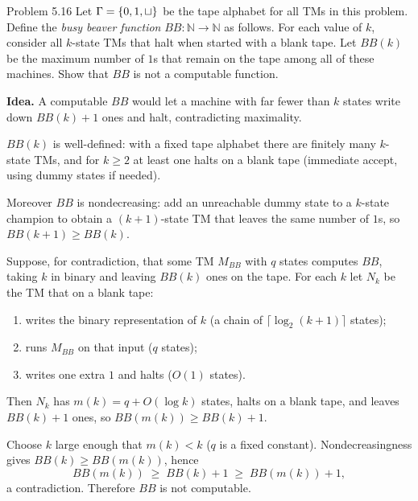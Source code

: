 \begin{question}{Problem 5.16}
Let $\Gamma=\{0,1,\sqcup\}$ be the tape alphabet for all TMs in this problem. Define the \emph{busy beaver function} $BB\colon\mathbb{N}\to\mathbb{N}$ as follows. For each value of $k$, consider all $k$-state TMs that halt when started with a blank tape. Let $BB(k)$ be the maximum number of $1$s that remain on the tape among all of these machines. Show that $BB$ is not a computable function.
\end{question}
\begin{soln}
\textbf{Idea.} A computable $BB$ would let a machine with far fewer than $k$ states write down $BB(k)+1$ ones and halt, contradicting maximality.

$BB(k)$ is well-defined: with a fixed tape alphabet there are finitely many $k$-state TMs, and for $k\ge 2$ at least one halts on a blank tape (immediate accept, using dummy states if needed).

Moreover $BB$ is nondecreasing: add an unreachable dummy state to a $k$-state champion to obtain a $(k+1)$-state TM that leaves the same number of $1$s, so $BB(k+1)\ge BB(k)$.

Suppose, for contradiction, that some TM $M_{BB}$ with $q$ states computes $BB$, taking $k$ in binary and leaving $BB(k)$ ones on the tape. For each $k$ let $N_k$ be the TM that on a blank tape:
\begin{enumerate}
\item writes the binary representation of $k$ (a chain of $\lceil\log_2(k+1)\rceil$ states);
\item runs $M_{BB}$ on that input ($q$ states);
\item writes one extra $1$ and halts ($O(1)$ states).
\end{enumerate}
Then $N_k$ has $m(k)=q+O(\log k)$ states, halts on a blank tape, and leaves $BB(k)+1$ ones, so $BB(m(k))\ge BB(k)+1$.

Choose $k$ large enough that $m(k)<k$ ($q$ is a fixed constant). Nondecreasingness gives $BB(k)\ge BB(m(k))$, hence
\[
BB(m(k))\;\ge\; BB(k)+1\;\ge\; BB(m(k))+1,
\]
a contradiction. Therefore $BB$ is not computable.
\end{soln}

